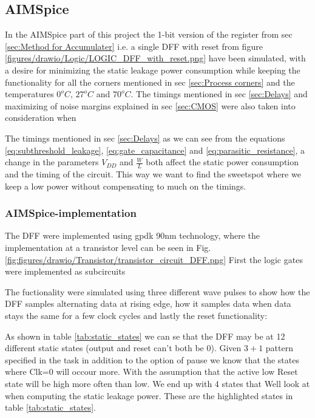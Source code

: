 \subsection{AIMSpice}
In the AIMSpice part of this project the 1-bit version of the register from sec \ref{sec:Method for Accumulater} i.e. a single DFF with reset from figure \ref{figures/drawio/Logic/LOGIC_DFF_with_reset.png} have been simulated, with a desire for minimizing the static leakage power consumption while keeping the functionality for all the corners mentioned in sec \ref{sec:Process corners} and the temperatures $0^o C$, $27^o C$ and $70^o C$. The timings mentioned in sec \ref{sec:Delays} and maximizing of noise margins explained in sec \ref{sec:CMOS} were also taken into consideration when 

The timings mentioned in sec \ref{sec:Delays} as we can see from the equations \ref{eq:subthreshold_leakage}, \ref{eq:gate_capacitance} and \ref{eq:parasitic_resistance}, a change in the parameters $V_{DD}$ and $\frac{W}{L}$ both affect the static power consumption and the timing of the circuit. This way we want to find the sweetspot where we keep a low power without compensating to much on the timings.

\subsubsection{AIMSpice-implementation}
The DFF were implemented using gpdk 90nm technology, where the implementation at a transistor level can be seen in Fig. \ref{fig:figures/drawio/Transistor/transistor_circuit_DFF.png} First the logic gates were implemented as subcircuits


The fuctionality were simulated using three different wave pulses to show how the DFF samples alternating data at rising edge, how it samples data when data stays the same for a few clock cycles and lastly the reset functionality:


As shown in table \ref{tab:static_states} we can se that the DFF may be at 12 different static states (output and reset can't both be 0). Given $3+1$ pattern specified in the task in addition to the option of pause we know that the states where Clk=0 will occour more. With the assumption that the active low Reset state will be high more often than low. We end up with 4 states that Well look at when computing the static leakage power. These are the highlighted states in table \ref{tab:static_states}.

